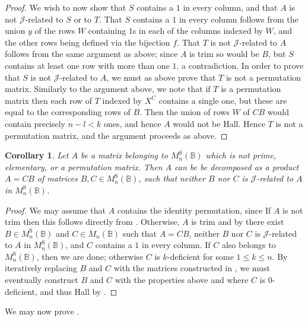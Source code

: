 \documentclass[11pt]{article}
\newtheorem{cor}[thm]{Corollary}
\numberwithin{equation}{section}
\newcommand{\B}{\mathbb{B}}
\newcommand{\Bn}{M_n(\B)}
\newcommand{\Halln}{M_n^{\text{S}}(\B)}
\newcommand{\J}{\mathscr{J}}
\begin{document}
\begin{proof}
  We wish to now show that $S$ contains a $1$ in every column, and that $A$ is
  not $\J$-related to $S$ or to $T$. That $S$ contains a $1$ in every column
  follows from the union $y$ of the rows $W$ containing $1$s in each of the columns
  indexed by $W$, and the other rows being defined via the bijection $f$. That
  $T$ is not $\J$-related to $A$ follows from the same argument as above; since
  $A$ is trim so would be $B$, but $S$ contains at least one row with more than
  one $1$, a contradiction. In order to prove that $S$ is not $\J$-related to
  $A$, we must as above prove that $T$ is not a permutation matrix. Similarly to
  the argument above, we note that if $T$ is a permutation matrix then each row
  of $T$ indexed by $X^C$ contains a single one, but these are equal to the
  corresponding rows of $B$.  Then the union of rows $W$ of $CB$ would contain
  precisely $n - l < k$ ones, and hence $A$ would not be Hall. Hence $T$ is not
  a permutation matrix, and the argument proceeds as above. 
\end{proof}

\begin{cor}
  Let $A$ be a matrix belonging to $\Halln$ which is not prime, elementary,
  or a permutation matrix. Then $A$ can be be decomposed as a product $A = CB$
  of matrices $B, C \in \Halln$, such that neither $B$ nor $C$ is $\J$-related
  to $A$ in $\Halln$.
\end{cor}
\begin{proof}
  We may assume that $A$ contains the identity permutation, since If $A$ is not
  trim then this follows directly from .
  Otherwise, $A$ is trim and by  there exist $B \in
  \Halln$ and $C \in \Bn$ such that $A = CB$, neither $B$ nor $C$ is
  $\J$-related to $A$ in $\Halln$, and $C$ contains a $1$ in every column. If
  $C$ also belongs to $\Halln$, then we are done; otherwise $C$ is $k$-deficient
  for some $1 \leq k \leq n$. By iteratively replacing $B$ and $C$ with the
  matrices constructed in , we must eventually
  construct $B$ and $C$ with the properties above and where $C$ is
  $0$-deficient, and thus Hall by .
\end{proof}

We may now prove .
\end{document}
